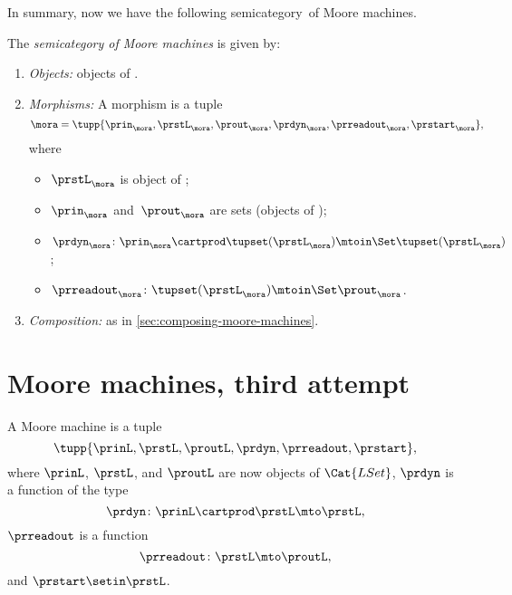 In summary, now we have the following semicategory~\Moore of Moore machines.
%
\begin{definition}[\Moore]
    \label{def:Moore}
    The \emph{semicategory of Moore machines} \Moore is given by:
    \begin{enumerate}
        \item \emph{Objects:} objects of \Set.
        \item \emph{Morphisms:}
              A morphism is a tuple
              \begin{equation*}
                  \mora = \tupp{\prin_{\mora},\prstL_{\mora},\prout_{\mora},\prdyn_{\mora},\prreadout_{\mora},\prstart_{\mora}},
              \end{equation*}
              where
              \begin{itemize}
                  \item $\prstL_{\mora}$ is object of \SetL;
                  \item $\prin_{\mora}$ and~$\prout_{\mora}$ are sets (objects of \Set);
                  \item $ \prdyn_{\mora} \colon \prin_{\mora}\cartprod \tupset(\prstL_\mora) \mtoin\Set  \tupset(\prstL_\mora)$;
                  \item $ \prreadout_{\mora} \colon \tupset(\prstL_{\mora})  \mtoin\Set \prout_{\mora}$.
              \end{itemize}
        \item \emph{Composition:}
              as in \cref{sec:composing-moore-machines}.
    \end{enumerate}
\end{definition}
%

\section{Moore machines, third attempt}

\begin{definition}
    \label{def:moore_machine_3rd}
    A Moore machine is a tuple
    \begin{equation}
        \label{eq:moore-tuple-improved-again}
        \tupp{\prinL,\prstL,\proutL,\prdyn,\prreadout,\prstart},
    \end{equation}
    where $\prinL$, $\prstL$, and $\proutL$ are now objects of $\Cat{LSet}$, $\prdyn$ is a function of the type
    \begin{equation}
        \prdyn \colon \prinL \cartprod \prstL \mto \prstL,
    \end{equation}
    $\prreadout$ is a function
    \begin{equation}
        \prreadout \colon \prstL \mto \proutL,
    \end{equation}
    and $\prstart \setin \prstL$.
\end{definition}



